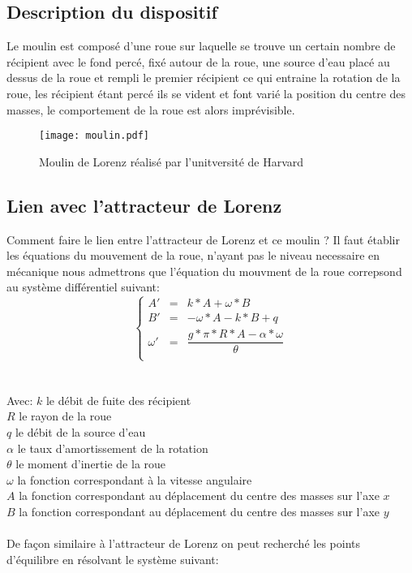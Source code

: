 \subsection{Description du dispositif}

Le moulin est composé d'une roue sur laquelle se trouve un certain nombre de récipient avec le fond percé, fixé autour de la roue, une source d'eau placé au dessus de la roue et rempli le premier récipient ce qui entraine la rotation de la roue, les récipient étant percé ils se vident et font varié la position du centre des masses, le comportement de la roue est alors imprévisible.

\begin{figure}
    \texttt{[image: moulin.pdf]}
    \caption{Moulin de Lorenz réalisé par l'unitversité de Harvard} 
\end{figure}

\subsection{Lien avec l'attracteur de Lorenz}
Comment faire le lien entre l'attracteur de Lorenz et ce moulin ? Il faut établir les équations du mouvement de la roue, n'ayant pas le niveau necessaire en mécanique nous admettrons que l'équation du mouvment de la roue correpsond au système différentiel suivant:\\
\[
    \left\{
    \begin{array}{rcl}
        A'&=&k*A+\omega*B\\
        B'&=&-\omega*A-k*B+q\\
        \omega'&=&\dfrac{g*\pi*R*A-\alpha*\omega}{\theta }\\
    \end{array}
    \right.
\]\\\\
Avec: $k$ le débit de fuite des récipient\\
$R$ le rayon de la roue\\
$q$ le débit de la source d'eau\\
$\alpha$ le taux d'amortissement de la rotation\\
$\theta$ le moment d'inertie de la roue\\
$\omega$ la fonction correspondant à la vitesse angulaire\\
$A$ la fonction correspondant au déplacement du centre des masses sur l'axe $x$\\
$B$ la fonction correspondant au déplacement du centre des masses sur l'axe $y$\\\\

De façon similaire à l'attracteur de Lorenz on peut recherché les points d'équilibre en résolvant le système suivant: